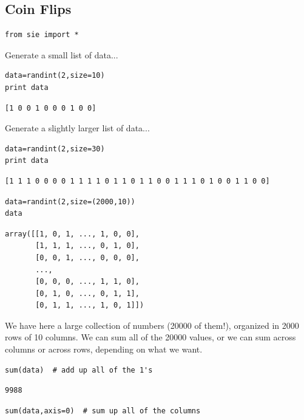 \subsection{Coin Flips}


\begin{lstlisting}
from sie import *
\end{lstlisting}

Generate a small list of data...

\begin{lstlisting}
data=randint(2,size=10)
print data
\end{lstlisting}

\begin{verbatim}
[1 0 0 1 0 0 0 1 0 0]
\end{verbatim}

Generate a slightly larger list of data...

\begin{lstlisting}
data=randint(2,size=30)
print data
\end{lstlisting}

\begin{verbatim}
[1 1 1 0 0 0 0 1 1 1 1 0 1 1 0 1 1 0 0 1 1 1 0 1 0 0 1 1 0 0]
\end{verbatim}

\begin{lstlisting}
data=randint(2,size=(2000,10))
data
\end{lstlisting}

\begin{verbatim}
array([[1, 0, 1, ..., 1, 0, 0],
       [1, 1, 1, ..., 0, 1, 0],
       [0, 0, 1, ..., 0, 0, 0],
       ..., 
       [0, 0, 0, ..., 1, 1, 0],
       [0, 1, 0, ..., 0, 1, 1],
       [0, 1, 1, ..., 1, 0, 1]])
\end{verbatim}

We have here a large collection of numbers (20000 of them!), organized in 2000
rows of 10 columns.  We can sum all of the 20000 values, or we can sum across
columns or across rows, depending on what we want.

\begin{lstlisting}
sum(data)  # add up all of the 1's
\end{lstlisting}

\begin{verbatim}
9988
\end{verbatim}

\begin{lstlisting}
sum(data,axis=0)  # sum up all of the columns
\end{lstlisting}

